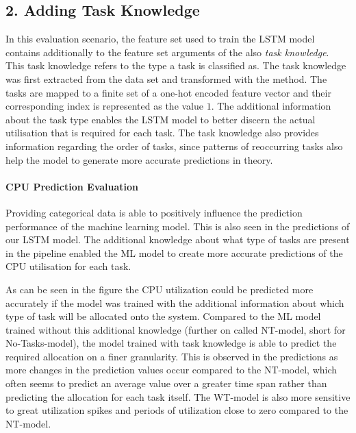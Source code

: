   \subsection*{2. Adding Task Knowledge}
  \label{sec:adding-task-knowledge-evaluation-scenarios}

    In this evaluation scenario, the feature set used to train the LSTM model contains additionally to the feature set arguments of the  also \emph{task knowledge}. This task knowledge refers to the type a task is classified as. The task knowledge was first extracted from the data set and transformed with the  method. 
    The tasks are mapped to a finite set of a one-hot encoded feature vector and their corresponding index is represented as the value $1$.
    The additional information about the task type enables the LSTM model to better discern the actual utilisation that is required for each task.
    The task knowledge also provides information regarding the order of tasks, since patterns of reoccurring tasks also help the model to generate more accurate predictions in theory.

    \paragraph{CPU Prediction Evaluation}
    \label{par:cpu-prediction-evaluation-task-knowledge}

      Providing categorical data is able to positively influence the prediction performance of the machine learning model. This is also seen in the predictions of our LSTM model. The additional knowledge about what type of tasks are present in the pipeline enabled the ML model to create more accurate predictions of the CPU utilisation for each task.

      As can be seen in the figure 
      the CPU utilization could be predicted more accurately if the model was trained with the additional information about which type of task will be allocated onto the system.
      Compared to the ML model trained without this additional knowledge (further on called NT-model, short for No-Tasks-model), the model trained with task knowledge is able to predict the required allocation on a finer granularity.
      This is observed in the predictions as more changes in the prediction values occur compared to the NT-model, which often seems to predict an average value over a greater time span rather than predicting the allocation for each task itself.
      The WT-model is also more sensitive to great utilization spikes and periods of utilization close to zero compared to the NT-model.

